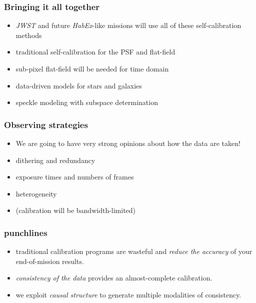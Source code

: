 \documentclass[pdftex]{beamer}
\newcommand{\conclusionslide}{
\begin{frame}
  \frametitle{punchlines}
  \begin{itemize}
  \item traditional calibration programs are wasteful and \emph{reduce the accuracy} of your end-of-mission results.
  \item \emph{consistency of the data} provides an almost-complete calibration.
  \item we exploit \emph{causal structure} to generate multiple modalities of consistency.
  \end{itemize}
\end{frame}
}
\begin{document}
\begin{frame}
  \frametitle{Bringing it all together}
  \begin{itemize}
  \item \textsl{JWST} and future \textsl{HabEx}-like missions will use all of these self-calibration methods
  \item traditional self-calibration for the PSF and flat-field
  \item sub-pixel flat-field will be needed for time domain
  \item data-driven models for stars and galaxies
  \item speckle modeling with subspace determination
  \end{itemize}
\end{frame}

\begin{frame}
  \frametitle{Observing strategies}
  \begin{itemize}
  \item We are going to have very strong opinions about how the data are taken!
  \item dithering and redundancy
  \item exposure times and numbers of frames
  \item heterogeneity
  \item (calibration will be bandwidth-limited)
  \end{itemize}
\end{frame}

\conclusionslide
\end{document}
